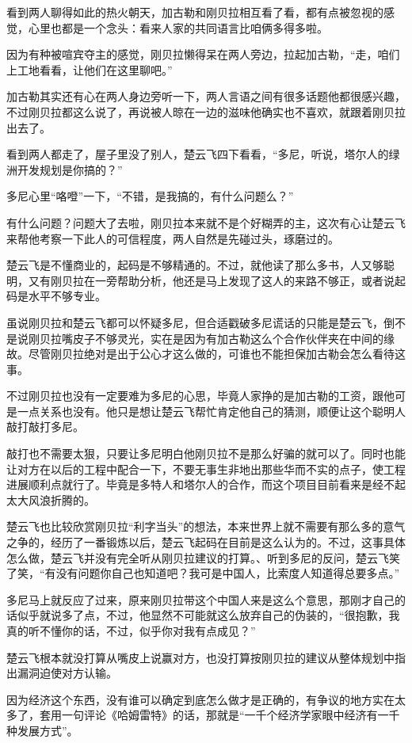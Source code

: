 看到两人聊得如此的热火朝天，加古勒和刚贝拉相互看了看，都有点被忽视的感觉，心里也都是一个念头：看来人家的共同语言比咱俩多得多啦。

因为有种被喧宾夺主的感觉，刚贝拉懒得呆在两人旁边，拉起加古勒，“走，咱们上工地看看，让他们在这里聊吧。”

加古勒其实还有心在两人身边旁听一下，两人言语之间有很多话题他都很感兴趣，不过刚贝拉都这么说了，再说被人晾在一边的滋味他确实也不喜欢，就跟着刚贝拉出去了。

看到两人都走了，屋子里没了别人，楚云飞四下看看，“多尼，听说，塔尔人的绿洲开发规划是你搞的？”

多尼心里“咯噔”一下，“不错，是我搞的，有什么问题么？”

有什么问题？问题大了去啦，刚贝拉本来就不是个好糊弄的主，这次有心让楚云飞来帮他考察一下此人的可信程度，两人自然是先碰过头，琢磨过的。

楚云飞是不懂商业的，起码是不够精通的。不过，就他读了那么多书，人又够聪明，又有刚贝拉在一旁帮助分析，他还是马上发现了这人的来路不够正，或者说起码是水平不够专业。

虽说刚贝拉和楚云飞都可以怀疑多尼，但合适戳破多尼谎话的只能是楚云飞，倒不是说刚贝拉嘴皮子不够灵光，实在是因为有加古勒这么个合作伙伴夹在中间的缘故。尽管刚贝拉绝对是出于公心才这么做的，可谁也不能担保加古勒会怎么看待这事。

不过刚贝拉也没有一定要难为多尼的心思，毕竟人家挣的是加古勒的工资，跟他可是一点关系也没有。他只是想让楚云飞帮忙肯定他自己的猜测，顺便让这个聪明人敲打敲打多尼。

敲打也不需要太狠，只要让多尼明白他刚贝拉不是那么好骗的就可以了。同时也能让对方在以后的工程中配合一下，不要无事生非地出那些华而不实的点子，使工程进展顺利点就行了。毕竟是多特人和塔尔人的合作，而这个项目目前看来是经不起太大风浪折腾的。

楚云飞也比较欣赏刚贝拉“利字当头”的想法，本来世界上就不需要有那么多的意气之争的，经历了一番锻炼以后，楚云飞起码在目前是这么认为的。不过，这事具体怎么做，楚云飞并没有完全听从刚贝拉建议的打算。、听到多尼的反问，楚云飞笑了笑，“有没有问题你自己也知道吧？我可是中国人，比索度人知道得总要多点。”

多尼马上就反应了过来，原来刚贝拉带这个中国人来是这么个意思，那刚才自己的话似乎就说多了点，不过，他显然不可能就这么放弃自己的伪装的，“很抱歉，我真的听不懂你的话，不过，似乎你对我有点成见？”

楚云飞根本就没打算从嘴皮上说赢对方，也没打算按刚贝拉的建议从整体规划中指出漏洞迫使对方认输。

因为经济这个东西，没有谁可以确定到底怎么做才是正确的，有争议的地方实在太多了，套用一句评论《哈姆雷特》的话，那就是“一千个经济学家眼中经济有一千种发展方式”。

